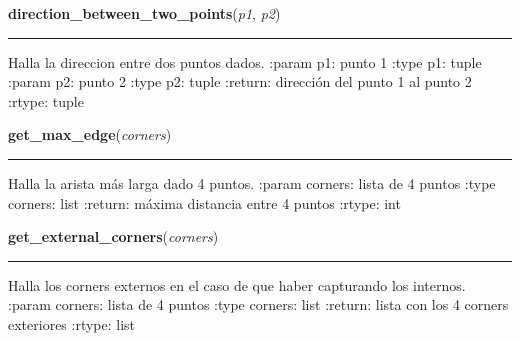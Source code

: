     \vspace{0.5ex}

\hspace{.8\funcindent}\begin{boxedminipage}{\funcwidth}

    \raggedright \textbf{direction\_between\_two\_points}(\textit{p1}, \textit{p2})

    \vspace{-1.5ex}

    \rule{\textwidth}{0.5\fboxrule}
\setlength{\parskip}{2ex}

Halla la direccion entre dos puntos dados.
:param p1: punto 1
:type p1: tuple
:param p2: punto 2
:type p2: tuple
:return: dirección del punto 1 al punto 2
:rtype: tuple
\setlength{\parskip}{1ex}
    \end{boxedminipage}

    \label{src:functions:get_max_edge}

    \vspace{0.5ex}

\hspace{.8\funcindent}\begin{boxedminipage}{\funcwidth}

    \raggedright \textbf{get\_max\_edge}(\textit{corners})

    \vspace{-1.5ex}

    \rule{\textwidth}{0.5\fboxrule}
\setlength{\parskip}{2ex}

Halla la arista más larga dado 4 puntos.
:param corners: lista de 4 puntos
:type corners: list
:return: máxima distancia entre 4 puntos
:rtype: int
\setlength{\parskip}{1ex}
    \end{boxedminipage}

    \label{src:functions:get_external_corners}

    \vspace{0.5ex}

\hspace{.8\funcindent}\begin{boxedminipage}{\funcwidth}

    \raggedright \textbf{get\_external\_corners}(\textit{corners})

    \vspace{-1.5ex}

    \rule{\textwidth}{0.5\fboxrule}
\setlength{\parskip}{2ex}

Halla los corners externos en el caso de que haber capturando los
internos.
:param corners: lista de 4 puntos
:type corners: list
:return: lista con los 4 corners exteriores
:rtype: list
\setlength{\parskip}{1ex}
    \end{boxedminipage}


